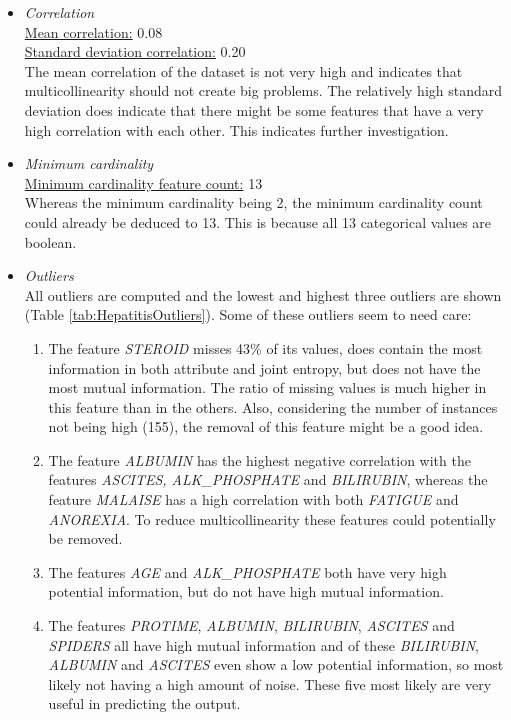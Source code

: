 \documentclass[10pt,a4paper]{report}
\begin{document}
	\begin{itemize}
		\item \textit{Correlation} \\
		\underline{Mean correlation:} 0.08 \\
		\underline{Standard deviation correlation:} 0.20 \\
		
		The mean correlation of the dataset is not very high and indicates that multicollinearity should not create big problems. The relatively high standard deviation does indicate that there might be some features that have a very high correlation with each other. This indicates further investigation.
		
		\item \textit{Minimum cardinality} \\
		\underline{Minimum cardinality feature count:} 13 \\
		
		Whereas the minimum cardinality being 2, the minimum cardinality count could already be deduced to 13. This is because all 13 categorical values are boolean.
		
		\item \textit{Outliers} \\
		
		All outliers are computed and the lowest and highest three outliers are shown (Table \ref{tab:HepatitisOutliers}). Some of these outliers seem to need care:
		\begin{enumerate}
			\item The feature \textit{STEROID} misses 43\% of its values, does contain the most information in both attribute and joint entropy, but does not have the most mutual information. The ratio of missing values is much higher in this feature than in the others. Also, considering the number of instances not being high (155), the removal of this feature might be a good idea.		
			\item The feature \textit{ALBUMIN} has the highest negative correlation with the features \textit{ASCITES, ALK\_PHOSPHATE} and \textit{BILIRUBIN},  whereas the feature \textit{MALAISE} has a high correlation with both \textit{FATIGUE} and \textit{ANOREXIA}. To reduce multicollinearity these features could potentially be removed.
			\item The features \textit{AGE} and \textit{ALK\_PHOSPHATE} both have very high potential information, but do not have high mutual information.
			\item The features \textit{PROTIME}, \textit{ALBUMIN}, \textit{BILIRUBIN}, \textit{ASCITES} and \textit{SPIDERS} all have high mutual information and of these \textit{BILIRUBIN}, \textit{ALBUMIN} and \textit{ASCITES} even show a low potential information, so most likely not having a high amount of noise. These five most likely are very useful in predicting the output.
		\end{enumerate}	
		

\end{itemize}
\end{document}

